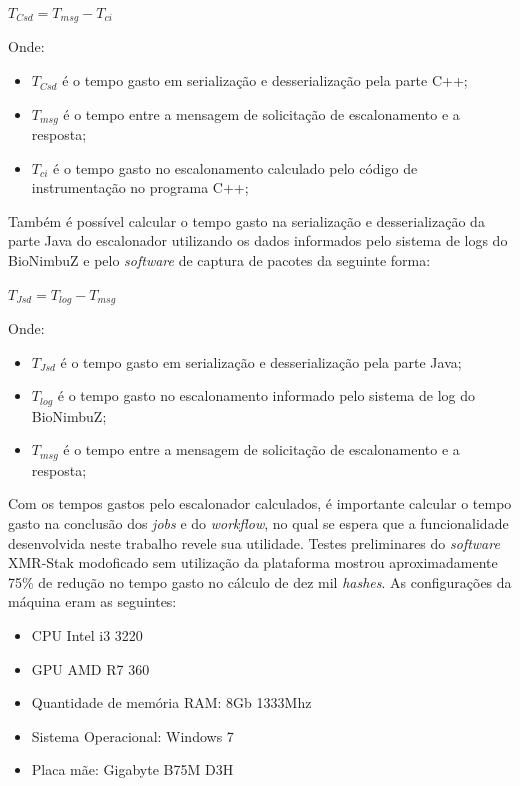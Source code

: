\centerline{ $T_{Csd} = T_{msg} - T_{ci}$ }

Onde: 
 \begin{itemize}
 	\item $T_{Csd}$ é o tempo gasto em serialização e desserialização pela parte C++;
 	\item $T_{msg}$ é o tempo entre a mensagem de solicitação de escalonamento e a resposta;
 	\item $T_{ci}$ é o tempo gasto no escalonamento calculado pelo código de instrumentação no programa C++;
 \end{itemize}

Também é possível calcular o tempo gasto na serialização e desserialização da parte Java do escalonador utilizando os dados informados pelo sistema de logs do BioNimbuZ e pelo \textit{software} de captura de pacotes da seguinte forma:

\centerline{ $T_{Jsd} = T_{log} - T_{msg}$ }

Onde: 
\begin{itemize}
	\item $T_{Jsd}$ é o tempo gasto em serialização e desserialização pela parte Java;
	\item $T_{log}$ é o tempo gasto no escalonamento informado pelo sistema de log do BioNimbuZ;
	\item $T_{msg}$ é o tempo entre a mensagem de solicitação de escalonamento e a resposta;
\end{itemize}

Com os tempos gastos pelo escalonador calculados, é importante calcular o tempo gasto na conclusão dos \textit{jobs} e do \textit{workflow}, no qual se espera que a funcionalidade desenvolvida neste trabalho revele sua utilidade. Testes preliminares do \textit{software} XMR-Stak modoficado sem utilização da plataforma mostrou aproximadamente 75\% de redução no tempo gasto no cálculo de dez mil \textit{hashes}. As configurações da máquina eram as seguintes:

\begin{itemize}
	\item \acrshort{CPU} Intel i3 3220
	\item \acrshort{GPU} AMD R7 360
	\item Quantidade de memória \acrshort{RAM}: 8Gb 1333Mhz
	\item Sistema Operacional: Windows 7
	\item Placa mãe: Gigabyte B75M D3H
\end{itemize}
 


